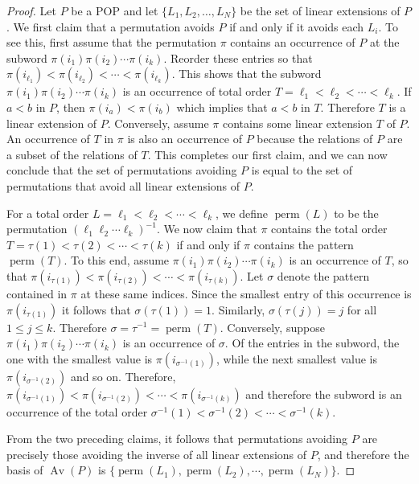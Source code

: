 \documentclass[11pt]{article}
\theoremstyle{definition}
\numberwithin{theorem}{section}
\numberwithin{question}{section}
\numberwithin{definition}{section}
\numberwithin{example}{section}
\numberwithin{remark}{section}
\newcommand{\Av}{\operatorname{Av}}
\DeclareMathOperator{\perm}{perm}
\begin{document}
\begin{proof}
	Let $P$ be a POP and let $\{L_1, L_2, \ldots, L_N\}$ be the set of linear extensions of $P$. We first claim that a permutation avoids $P$ if and only if it avoids each $L_i$. To see this, first assume that the permutation $\pi$ contains an occurrence of $P$ at the subword $\pi(i_1)\pi(i_2)\cdots\pi(i_k)$. Reorder these entries so that $\pi(i_{\ell_1}) < \pi(i_{\ell_2}) < \cdots < \pi(i_{\ell_k})$. This shows that the subword $\pi(i_1)\pi(i_2)\cdots\pi(i_k)$ is an occurrence of total order $T = \ell_1 < \ell_2 < \cdots < \ell_k$. If $a < b$ in $P$, then $\pi(i_a) < \pi(i_b)$ which implies that $a < b$ in $T$. Therefore $T$ is a linear extension of $P$. Conversely, assume $\pi$ contains some linear extension $T$ of $P$. An occurrence of $T$ in $\pi$ is also an occurrence of $P$ because the relations of $P$ are a subset of the relations of $T$. This completes our first claim, and we can now conclude that the set of permutations avoiding $P$ is equal to the set of permutations that avoid all linear extensions of $P$.

	For a total order $L = \ell_1 < \ell_2 < \cdots < \ell_k$, we define $\perm(L)$ to be the permutation $(\ell_1\ell_2\cdots\ell_k)^{-1}$. We now claim that $\pi$ contains the total order $T = \tau(1) < \tau(2) < \cdots < \tau(k)$ if and only if $\pi$ contains the pattern $\perm(T)$. To this end, assume $\pi(i_1)\pi(i_2)\cdots \pi(i_k)$ is an occurrence of $T$, so that $\pi(i_{\tau(1)}) < \pi(i_{\tau(2)}) < \cdots < \pi(i_{\tau(k)})$. Let $\sigma$ denote the pattern contained in $\pi$ at these same indices. Since the smallest entry of this occurrence is $\pi(i_{\tau(1)})$ it follows that $\sigma(\tau(1)) = 1$. Similarly, $\sigma(\tau(j)) = j$ for all $1 \leq j \leq k$. Therefore $\sigma = \tau^{-1} = \perm(T)$. Conversely, suppose $\pi(i_1)\pi(i_2)\cdots\pi(i_k)$ is an occurrence of $\sigma$. Of the entries in the subword, the one with the smallest value is $\pi(i_{\sigma^{-1}(1)})$, while the next smallest value is $\pi(i_{\sigma^{-1}(2)})$ and so on. Therefore, $\pi(i_{\sigma^{-1}(1)}) < \pi(i_{\sigma^{-1}(2)}) < \cdots < \pi(i_{\sigma^{-1}(k)})$ and therefore the subword is an occurrence of the total order $\sigma^{-1}(1) < \sigma^{-1}(2) < \cdots < \sigma^{-1}(k)$.

	From the two preceding claims, it follows that permutations avoiding $P$ are precisely those avoiding the inverse of all linear extensions of $P$, and therefore the basis of $\Av(P)$ is $\{\perm(L_1),\allowbreak \perm(L_2),\allowbreak \cdots,\allowbreak \perm(L_N)\}$.
\end{proof}
\end{document}
